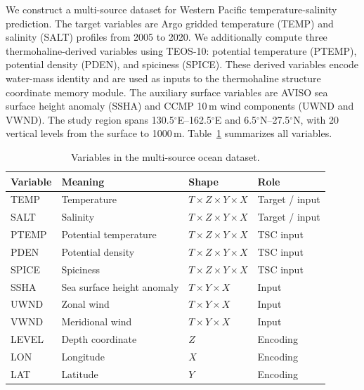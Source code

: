 \documentclass[conference]{IEEEtran}
\begin{document}
We construct a multi-source dataset for Western Pacific temperature-salinity prediction. The target variables are Argo gridded temperature (TEMP) and salinity (SALT) profiles from 2005 to 2020. We additionally compute three thermohaline-derived variables using TEOS-10: potential temperature (PTEMP), potential density (PDEN), and spiciness (SPICE). These derived variables encode water-mass identity and are used as inputs to the thermohaline structure coordinate memory module. The auxiliary surface variables are AVISO sea surface height anomaly (SSHA) and CCMP 10\,m wind components (UWND and VWND). The study region spans 130.5$^\circ$E--162.5$^\circ$E and 6.5$^\circ$N--27.5$^\circ$N, with 20 vertical levels from the surface to 1000\,m. Table~\ref{tab:variables} summarizes all variables.

\begin{table}[t]
\centering
\caption{Variables in the multi-source ocean dataset.}
\label{tab:variables}
\footnotesize
\setlength{\tabcolsep}{2.5pt}
\renewcommand{\arraystretch}{1.08}
\begin{tabular}{@{}llll@{}}
\toprule
\textbf{Variable} & \textbf{Meaning} & \textbf{Shape} & \textbf{Role} \\
\midrule
TEMP   & Temperature              & $T \times Z \times Y \times X$ & Target / input \\
SALT   & Salinity                 & $T \times Z \times Y \times X$ & Target / input \\
PTEMP  & Potential temperature    & $T \times Z \times Y \times X$ & TSC input \\
PDEN   & Potential density        & $T \times Z \times Y \times X$ & TSC input \\
SPICE  & Spiciness                & $T \times Z \times Y \times X$ & TSC input \\
SSHA   & Sea surface height anomaly & $T \times Y \times X$        & Input \\
UWND   & Zonal wind               & $T \times Y \times X$        & Input \\
VWND   & Meridional wind           & $T \times Y \times X$        & Input \\
LEVEL  & Depth coordinate         & $Z$                           & Encoding \\
LON    & Longitude                & $X$                           & Encoding \\
LAT    & Latitude                 & $Y$                           & Encoding \\
\bottomrule
\end{tabular}
\end{table}
\end{document}
